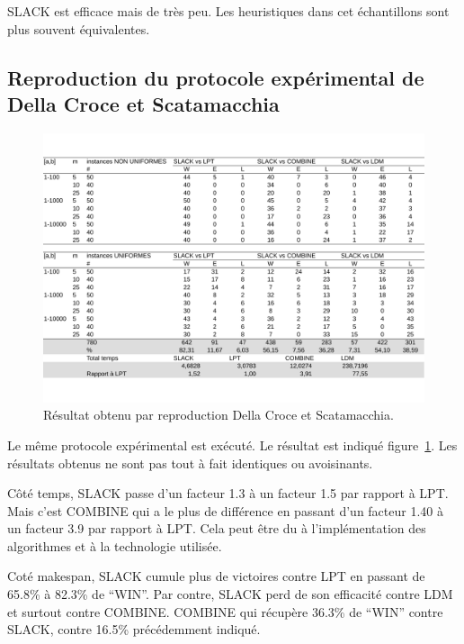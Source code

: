 \documentclass[a4paper,12pt]{report}
\theoremstyle{plain}				%
\theoremstyle{definition}				%
\begin{document}
SLACK est efficace mais de très peu. 
Les heuristiques dans cet échantillons sont plus souvent équivalentes.  
 
\subsection{Reproduction du protocole expérimental de Della Croce et Scatamacchia}
\label{ssec:resultatsReroductionPrtocoleExperimentalDellaCroceScatamacchia}
 
\begin{figure}
{\centering
\includegraphics[width=\columnwidth]{3_Resultat_Reproduction_De_DCS.pdf}
\caption{Résultat obtenu par reproduction Della Croce et Scatamacchia.}
\label{fig:resultatReproductionDellaCroceScatamacchia}
\par}
\end{figure}

Le même protocole expérimental est exécuté. Le résultat est indiqué 
  figure~\ref{fig:resultatReproductionDellaCroceScatamacchia}.
Les résultats obtenus ne sont pas tout à fait identiques ou avoisinants. 
  
Côté temps, SLACK passe d'un facteur 1.3 à un facteur 1.5 par rapport à LPT. 
Mais c'est COMBINE qui a le plus de différence en passant d'un facteur 1.40 
  à un facteur 3.9 par rapport à LPT. 
Cela peut être du à l'implémentation des algorithmes et à la technologie utilisée. 

Coté makespan, SLACK cumule plus de victoires contre LPT en passant de 65.8\% à 82.3\% de ``WIN''.
Par contre, SLACK perd de son efficacité contre LDM et surtout contre COMBINE. COMBINE qui récupère 36.3\% de ``WIN'' contre SLACK, contre 16.5\% précédemment indiqué.
\end{document}
